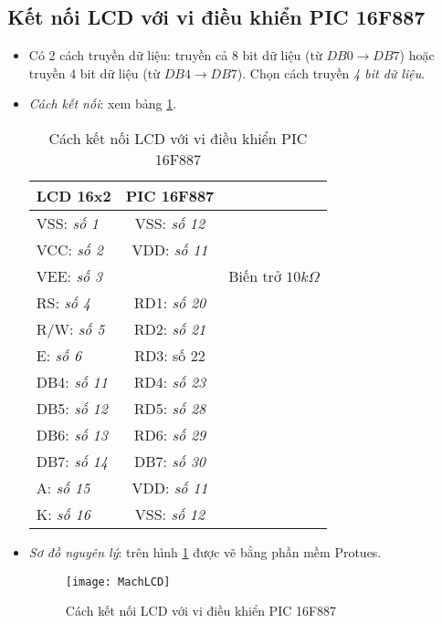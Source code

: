 \subsection{Kết nối LCD với vi điều khiển PIC 16F887}
\begin{itemize}
\item Có 2 cách truyền dữ liệu: truyền cả 8 bit dữ liệu (từ $DB0 \rightarrow DB7$) hoặc truyền 4 bit dữ liệu (từ $DB4 \rightarrow DB7$). Chọn cách truyền \textit{4 bit dữ liệu}.
\item \textit{Cách kết nối}: xem bảng \ref{conLCD}.
\newpage
\begin{table}[!h]
\begin{center}
\begin{tabular}{|l|c|c|}\hline
\textbf{LCD 16x2} & \textbf{PIC 16F887} & \\ \hline
VSS: \textit{số 1} & VSS: \textit{số 12} & \\ \hline
VCC: \textit{số 2} & VDD: \textit{số 11} & \\ \hline
VEE: \textit{số 3} & & Biến trở $10k\Omega$ \\ \hline
RS: \textit{số 4} & RD1: \textit{số 20} & \\ \hline
R/W: \textit{số 5} & RD2: \textit{số 21} & \\ \hline
E: \textit{số 6} & RD3: số 22 & \\ \hline
DB4: \textit{số 11} & RD4: \textit{số 23} & \\ \hline
DB5: \textit{số 12} & RD5: \textit{số 28} & \\ \hline
DB6: \textit{số 13} & RD6: \textit{số 29} & \\ \hline
DB7: \textit{số 14} & DB7: \textit{số 30} & \\ \hline
A: \textit{số 15} & VDD: \textit{số 11} & \\ \hline
K: \textit{số 16} & VSS: \textit{số 12} & \\ \hline
\end{tabular}
\end{center}
\caption{Cách kết nối LCD với vi điều khiển PIC 16F887} \label{conLCD}
\end{table}
\item \textit{Sơ đồ nguyên lý}: trên hình \ref{Fig:ketnoi-LCD-PIC} được vẽ bằng phần mềm Protues.
\begin{figure}[!h]
\begin{center}
\texttt{[image: MachLCD]}
\end{center}
\caption{Cách kết nối LCD với vi điều khiển PIC 16F887}\label{Fig:ketnoi-LCD-PIC}
\end{figure}
\end{itemize}
